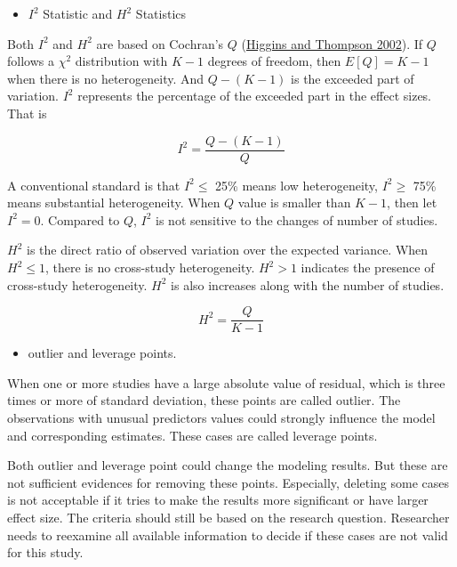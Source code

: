 \documentclass[
  11pt,
  openany]{memoir}
\providecommand{\tightlist}{%
  \setlength{\itemsep}{0pt}\setlength{\parskip}{0pt}}
\begin{document}
\begin{itemize}
\tightlist
\item
  \(I^2\) Statistic and \(H^2\) Statistics
\end{itemize}

Both \(I^2\) and \(H^2\) are based on Cochran's \(Q\) (\protect\hyperlink{ref-higginsQuantifyingHeterogeneityMetaanalysis2002}{Higgins and Thompson 2002}).
If \(Q\) follows a \(\chi^2\) distribution with \(K-1\) degrees of freedom, then \(E[Q]=K-1\) when there is no heterogeneity.
And \(Q-(K-1)\) is the exceeded part of variation.
\(I^2\) represents the percentage of the exceeded part in the effect sizes. That is

\begin{equation}
I^2 = \frac{Q-(K-1)}{Q}
\end{equation}

A conventional standard is that \(I^2\le\) 25\% means low heterogeneity, \(I^2\ge\) 75\% means substantial heterogeneity.
When \(Q\) value is smaller than \(K-1\), then let \(I^2=0\).
Compared to \(Q\), \(I^2\) is not sensitive to the changes of number of studies.

\(H^2\) is the direct ratio of observed variation over the expected variance.
When \(H^2\le1\), there is no cross-study heterogeneity. \(H^2>1\) indicates the presence of cross-study heterogeneity.
\(H^2\) is also increases along with the number of studies.

\begin{equation}
H^2 = \frac{Q}{K-1}
\end{equation}

\begin{itemize}
\tightlist
\item
  outlier and leverage points.
\end{itemize}

When one or more studies have a large absolute value of residual, which is three times or more of standard deviation, these points are called outlier.
The observations with unusual predictors values could strongly influence the model and corresponding estimates. These cases are called leverage points.

Both outlier and leverage point could change the modeling results. But these are not sufficient evidences for removing these points.
Especially, deleting some cases is not acceptable if it tries to make the results more significant or have larger effect size.
The criteria should still be based on the research question.
Researcher needs to reexamine all available information to decide if these cases are not valid for this study.
\end{document}
